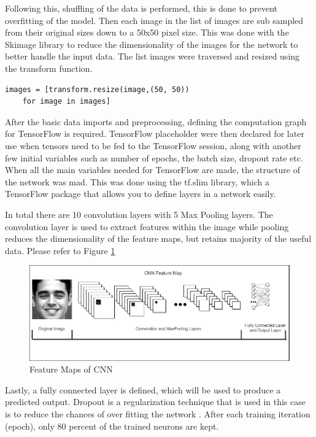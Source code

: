 Following this, shuffling of the data is performed, this is done to prevent overfitting of the model. Then each image in the list of images are sub sampled from their original sizes down to a 50x50 pixel size. This was done with the Skimage library to reduce the dimensionality of the images for the network to better handle the input data. The list images were traversed and resized using the transform function. 
\begin{lstlisting}[frame=single]
images = [transform.resize(image,(50, 50))
	for image in images]
\end{lstlisting}

After the basic data imports and preprocessing, defining the computation graph for TensorFlow is required. TensorFlow placeholder were then declared for later use when tensors need to be fed to the TensorFlow session, along with another few initial variables such as number of epochs, the batch size, dropout rate etc. When all the main variables needed for TensorFlow are made, the structure of the network was mad. This was done using the tf.slim library, which a TensorFlow package that allows you to define layers in a network easily. 

In total there are 10 convolution layers with 5 Max Pooling layers. The convolution layer is used to extract features within the image while pooling reduces the dimensionality of the feature maps, but retains majority of the useful data. Please refer to Figure \ref{map}

\begin{figure}[ht]
	\begin{center}
		\advance\leftskip-3cm
		\advance\rightskip-3cm
		\includegraphics[keepaspectratio=true,scale=0.48]{__resources/implementation/map.jpg}
		\caption{Feature Maps of CNN}
		\label{map}
	\end{center}
\end{figure}

Lastly, a fully connected layer is defined, which will be used to produce a predicted output. Dropout is a regularization technique that is used in this case is to reduce the chances of over fitting the network \citep{JMLR}. After each training iteration (epoch), only 80 percent of the trained neurons are kept.\\ \\

